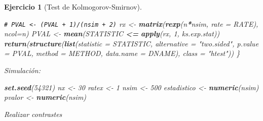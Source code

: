 \documentclass[
  spanish,
  10pt,
]{book}
\newenvironment{Shaded}{\begin{snugshade}}{\end{snugshade}}
\newcommand{\AttributeTok}[1]{\textcolor[rgb]{0.13,0.29,0.53}{#1}}
\newcommand{\CommentTok}[1]{\textcolor[rgb]{0.56,0.35,0.01}{\textit{#1}}}
\newcommand{\ControlFlowTok}[1]{\textcolor[rgb]{0.13,0.29,0.53}{\textbf{#1}}}
\newcommand{\DecValTok}[1]{\textcolor[rgb]{0.00,0.00,0.81}{#1}}
\newcommand{\FunctionTok}[1]{\textcolor[rgb]{0.13,0.29,0.53}{\textbf{#1}}}
\newcommand{\NormalTok}[1]{#1}
\newcommand{\OtherTok}[1]{\textcolor[rgb]{0.56,0.35,0.01}{#1}}
\newcommand{\SpecialCharTok}[1]{\textcolor[rgb]{0.81,0.36,0.00}{\textbf{#1}}}
\newcommand{\StringTok}[1]{\textcolor[rgb]{0.31,0.60,0.02}{#1}}
\theoremstyle{break}
\newtheorem{exercise}{Ejercicio}[chapter]
\theoremstyle{nonumberplain}
\renewcommand{\CommentTok}[1]{\textcolor[rgb]{0.41,0.41,0.41}{\texttt{#1}}}
\begin{document}
\begin{exercise}[Test de Kolmogorov-Smirnov]
\begin{enumerate}
\begin{Shaded}
\begin{Highlighting}[]
  \CommentTok{\# PVAL \textless{}{-} (PVAL + 1)/(nsim + 2)}
\NormalTok{  rx }\OtherTok{\textless{}{-}} \FunctionTok{matrix}\NormalTok{(}\FunctionTok{rexp}\NormalTok{(n}\SpecialCharTok{*}\NormalTok{nsim, }\AttributeTok{rate =}\NormalTok{ RATE), }\AttributeTok{ncol=}\NormalTok{n)}
\NormalTok{  PVAL }\OtherTok{\textless{}{-}} \FunctionTok{mean}\NormalTok{(STATISTIC }\SpecialCharTok{\textless{}=} \FunctionTok{apply}\NormalTok{(rx, }\DecValTok{1}\NormalTok{, ks.exp.stat))}
  \FunctionTok{return}\NormalTok{(}\FunctionTok{structure}\NormalTok{(}\FunctionTok{list}\NormalTok{(}\AttributeTok{statistic =}\NormalTok{ STATISTIC, }\AttributeTok{alternative =} \StringTok{"two.sided"}\NormalTok{, }
                   \AttributeTok{p.value =}\NormalTok{ PVAL, }\AttributeTok{method =}\NormalTok{ METHOD, }\AttributeTok{data.name =}\NormalTok{ DNAME), }
                   \AttributeTok{class =} \StringTok{"htest"}\NormalTok{))}
\NormalTok{\}}
\end{Highlighting}
\end{Shaded}

  Simulación:

\begin{Shaded}
\begin{Highlighting}[]
\FunctionTok{set.seed}\NormalTok{(}\DecValTok{54321}\NormalTok{)}
\NormalTok{nx }\OtherTok{\textless{}{-}} \DecValTok{30}
\NormalTok{ratex }\OtherTok{\textless{}{-}} \DecValTok{1}
\NormalTok{nsim }\OtherTok{\textless{}{-}} \DecValTok{500}
\NormalTok{estadistico }\OtherTok{\textless{}{-}} \FunctionTok{numeric}\NormalTok{(nsim)}
\NormalTok{pvalor }\OtherTok{\textless{}{-}} \FunctionTok{numeric}\NormalTok{(nsim)}
\end{Highlighting}
\end{Shaded}

  Realizar contrastes

\begin{Shaded}
\end{Shaded}


\end{enumerate}
\end{exercise}
\end{document}
